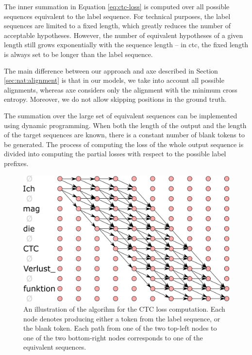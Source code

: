 The inner summation in Equation \ref{eq:ctc-loss} is computed over all possible
sequences equivalent to the label sequence. For technical purposes, the label
sequences are limited to a fixed length, which greatly reduces the number of
acceptable hypotheses. However, the number of equivalent hypotheses of a given
length still grows exponentially with the sequence length -- in \ac{ctc}, the
fixed length is always set to be longer than the label sequence.

The main difference between our approach and \ac{axe} described in Section
\ref{sec:nat:alignment} is that in our models, we take into account all
possible alignments, whereas \ac{axe} considers only the alignment with the
minimum cross entropy. Moreover, we do not allow skipping positions in the
ground truth.

The summation over the large set of equivalent sequences can be implemented
using dynamic programming. When both the length of the output and the length of
the target sequences are known, there is a constant number of blank tokens to
be generated. The process of computing the loss of the whole output sequence is
divided into computing the partial losses with respect to the possible label
prefixes.

\begin{figure}
  \centering

  \includegraphics[width=13cm]{img/ctc_schema.png}

  \caption{An illustration of the algorihm for the CTC loss computation. Each
    node denotes producing either a token from the label sequence, or the blank
    token. Each path from one of the two top-left nodes to one of the two
    bottom-right nodes corresponds to one of the equivalent sequences.  }
  \label{fig:ctc-dynamic-programming}
\end{figure}

